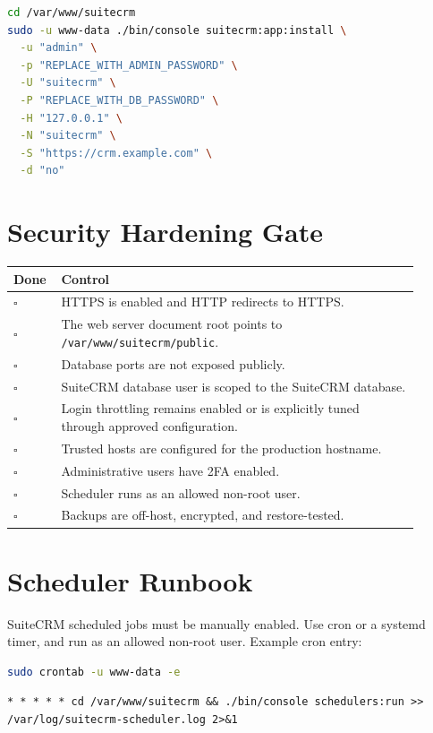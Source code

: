\documentclass[11pt]{article}
\begin{document}
\begin{lstlisting}[language=bash]
cd /var/www/suitecrm
sudo -u www-data ./bin/console suitecrm:app:install \
  -u "admin" \
  -p "REPLACE_WITH_ADMIN_PASSWORD" \
  -U "suitecrm" \
  -P "REPLACE_WITH_DB_PASSWORD" \
  -H "127.0.0.1" \
  -N "suitecrm" \
  -S "https://crm.example.com" \
  -d "no"
\end{lstlisting}

\section{Security Hardening Gate}
\begin{longtable}{L{0.08\linewidth} L{0.82\linewidth}}
\textbf{Done} & \textbf{Control} \\
\hline
$\square$ & HTTPS is enabled and HTTP redirects to HTTPS. \\
$\square$ & The web server document root points to \texttt{/var/www/suitecrm/public}. \\
$\square$ & Database ports are not exposed publicly. \\
$\square$ & SuiteCRM database user is scoped to the SuiteCRM database. \\
$\square$ & Login throttling remains enabled or is explicitly tuned through approved configuration. \\
$\square$ & Trusted hosts are configured for the production hostname. \\
$\square$ & Administrative users have 2FA enabled. \\
$\square$ & Scheduler runs as an allowed non-root user. \\
$\square$ & Backups are off-host, encrypted, and restore-tested. \\
\end{longtable}

\section{Scheduler Runbook}
SuiteCRM scheduled jobs must be manually enabled. Use cron or a systemd timer, and run as an allowed non-root user. Example cron entry:

\begin{lstlisting}[language=bash]
sudo crontab -u www-data -e
\end{lstlisting}

\begin{lstlisting}
* * * * * cd /var/www/suitecrm && ./bin/console schedulers:run >> /var/log/suitecrm-scheduler.log 2>&1
\end{lstlisting}
\end{document}
